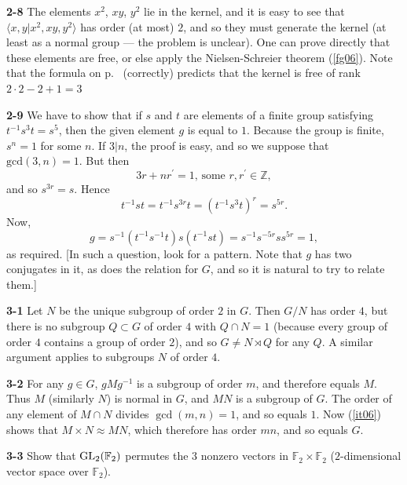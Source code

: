 \documentclass[a4paper,11pt,final]{memoir}%
\theoremstyle{nonumberplain}
\begin{document}
\bigskip\noindent\textbf{2-8}
The elements $x^{2}$, $xy$, $y^{2}$ lie in the kernel, and it is easy to see
that $\langle x,y|x^{2},xy,y^{2}\rangle$ has order (at most) $2$, and so they
must generate the kernel (at least as a normal group --- the problem is
unclear). One can prove directly that these elements are free, or else apply
the Nielsen-Schreier theorem (\ref{fg06}). Note that the formula on
p.~\pageref{fg06} (correctly) predicts that the kernel is free of rank
$2\cdot2-2+1=3$

\bigskip\noindent\textbf{2-9}
We have to show that if $s$ and $t$ are elements of a finite group satisfying
$t^{-1}s^{3}t=s^{5}$, then the given element $g$ is equal to $1$. Because the
group is finite, $s^{n}=1$ for some $n$. If $3|n$, the proof is easy, and so
we suppose that $\mathrm{gcd}(3,n)=1$. But then
\[
3r+nr^{\prime}=1\text{, some }r,r^{\prime}\in\mathbb{Z}{},
\]
and so $s^{3r}=s$. Hence
\[
t^{-1}st=t^{-1}s^{3r}t=(t^{-1}s^{3}t)^{r}=s^{5r}.
\]
Now,\hfill%
\[
g=s^{-1}(t^{-1}s^{-1}t)s(t^{-1}st)=s^{-1}s^{-5r}ss^{5r}=1,
\]
as required. [In such a question, look for a pattern. Note that $g$ has two
conjugates in it, as does the relation for $G$, and so it is natural to try to
relate them.]

\bigskip\noindent\textbf{3-1}
Let $N$ be the unique subgroup of order $2$ in $G$. Then $G/N$ has order $4$,
but there is no subgroup $Q\subset G$ of order $4$ with $Q\cap N=1$ (because
every group of order $4$ contains a group of order $2$), and so $G\neq
N\rtimes Q$ for any $Q$. A similar argument applies to subgroups $N$ of order
$4$.

\bigskip\noindent\textbf{3-2}
For any $g\in G$, $gMg^{-1}$ is a subgroup of order $m$, and therefore equals
$M$. Thus $M$ (similarly $N$) is normal in $G $, and $MN$ is a subgroup of
$G$. The order of any element of $M\cap N$ divides $\gcd(m,n)=1$, and so
equals $1$. Now (\ref{it06}) shows that $M\times N\approx MN$, which therefore
has order $mn$, and so equals $G$.

\bigskip\noindent\textbf{3-3}
Show that $\operatorname{GL}_{2}(\mathbb{F}_{2})$ permutes the $3$ nonzero vectors in
$\mathbb{F}_{2}\times\mathbb{F}{}_{2}$ ($2$-dimensional vector space over
$\mathbb{F}{}_{2}$).
\end{document}
